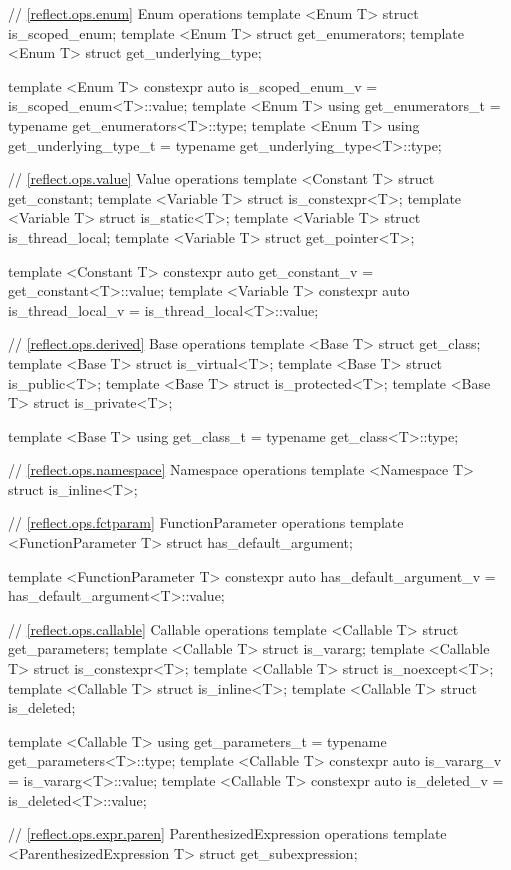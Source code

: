 \begin{std.txt}
\begin{codeblock}
{{// \ref{reflect.ops.enum} Enum operations
template <Enum T> struct is_scoped_enum;
template <Enum T> struct get_enumerators;
template <Enum T> struct get_underlying_type;

template <Enum T>
  constexpr auto is_scoped_enum_v = is_scoped_enum<T>::value;
template <Enum T>
  using get_enumerators_t = typename get_enumerators<T>::type;
template <Enum T>
  using get_underlying_type_t = typename get_underlying_type<T>::type;

// \ref{reflect.ops.value} Value operations
template <Constant T> struct get_constant;
template <Variable T> struct is_constexpr<T>;
template <Variable T> struct is_static<T>;
template <Variable T> struct is_thread_local;
template <Variable T> struct get_pointer<T>;

template <Constant T>
  constexpr auto get_constant_v = get_constant<T>::value;
template <Variable T>
  constexpr auto is_thread_local_v = is_thread_local<T>::value;

// \ref{reflect.ops.derived} Base operations
template <Base T> struct get_class;
template <Base T> struct is_virtual<T>;
template <Base T> struct is_public<T>;
template <Base T> struct is_protected<T>;
template <Base T> struct is_private<T>;

template <Base T>
  using get_class_t = typename get_class<T>::type;

// \ref{reflect.ops.namespace} Namespace operations
template <Namespace T> struct is_inline<T>;

// \ref{reflect.ops.fctparam} FunctionParameter operations
template <FunctionParameter T> struct has_default_argument;

template <FunctionParameter T>
  constexpr auto has_default_argument_v = has_default_argument<T>::value;

// \ref{reflect.ops.callable} Callable operations
template <Callable T> struct get_parameters;
template <Callable T> struct is_vararg;
template <Callable T> struct is_constexpr<T>;
template <Callable T> struct is_noexcept<T>;
template <Callable T> struct is_inline<T>;
template <Callable T> struct is_deleted;

template <Callable T>
  using get_parameters_t = typename get_parameters<T>::type;
template <Callable T>
  constexpr auto is_vararg_v = is_vararg<T>::value;
template <Callable T>
  constexpr auto is_deleted_v = is_deleted<T>::value;

// \ref{reflect.ops.expr.paren} ParenthesizedExpression operations
template <ParenthesizedExpression T> struct get_subexpression;

}}
\end{codeblock}
\end{std.txt}
